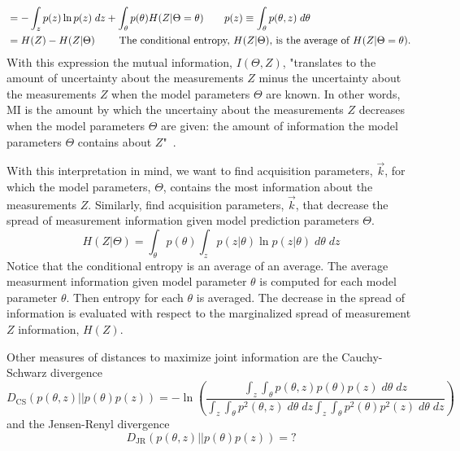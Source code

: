 \documentclass[10pt]{amsart}
\begin{document}
\begin{enumerate}
\[\begin{split}
& =  - \int_z p(z) \ln p(z)       \; dz
     + \int_\theta 
       p(\theta)
       H(Z|\Theta= \theta)
    \qquad
     p(z) \equiv \int_\theta p(\theta,z) \; d\theta  
\\
& =  H(Z) - H(Z|\Theta)
\qquad
\text{
The conditional entropy, $H(Z|\Theta)$, is the average  of $ H(Z|\Theta = \theta)$.
}
\end{split}
\]
With this expression the mutual information,  $I(\Theta,Z)$,
"translates to the amount of uncertainty about the measurements $Z$
minus the uncertainty about the measurements $Z$ when the model parameters
$\Theta$ are known. In other words, MI is the amount by which the uncertainy
about the measurements $Z$ decreases when the model parameters $\Theta$ are
given: the amount of information the model parameters $\Theta$ contains
about $Z$"~\cite{Pluim2003}.
 
{\color{red}
With this interpretation in mind, we want to find acquisition parameters,
$\vec{k}$, for which the model parameters, $\Theta$, contains the most 
information about the measurements $Z$. Similarly, find acquisition parameters, $\vec{k}$, that decrease
the spread of measurement information given model prediction parameters $\Theta$.
\[
 H(Z|\Theta) = 
       \int_\theta 
       p(\theta)
       \int_z 
       p(z|\theta) \ln p(z|\theta) \; d\theta \; dz
\]
Notice that the conditional entropy is an average of an average.
The average measurment information given model parameter $\theta$ is computed for each model
parameter $\theta$. Then entropy for each $\theta$ is averaged.
The decrease in the spread of information is evaluated with respect to
the marginalized spread of measurement $Z$ information, $H(Z)$.
}

Other measures of distances to maximize joint information are the
Cauchy-Schwarz divergence~\cite{Kampa2011} 
\[
D_\text{CS}(p(\theta,z)||p(\theta)p(z)) =  -\ln\left(
\frac{\int_z \int_\theta p(\theta,z) p(\theta)p(z) \; d\theta \; dz}
     {\int_z \int_\theta p^2(\theta,z) \; d\theta \; dz \int_z \int_\theta p^2(\theta)p^2(z) \; d\theta \; dz}
\right) 
\]
and the Jensen-Renyl divergence~\cite{hamza2003jensen}
\[
D_\text{JR}(p(\theta,z)||p(\theta)p(z)) =   ? 
\]




\end{enumerate}
\end{document}
